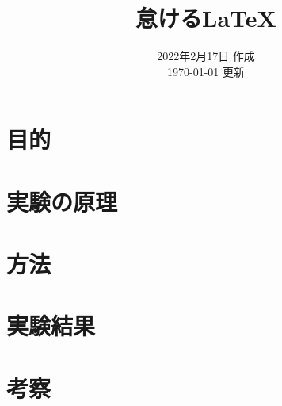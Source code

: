 \documentclass[uplatex,a4paper,10pt,dvipdfmx]{jsarticle}
\title{怠ける\LaTeX}
\author{\myid  \myname}
\date {2022年2月17日 作成\\\today{} 更新}
\begin{document}
\maketitle

\section{目的}

\section{実験の原理}

\section{方法}

\section{実験結果}

\section{考察}


\begin{thebibliography}{9}
\end{thebibliography}
\end{document}
